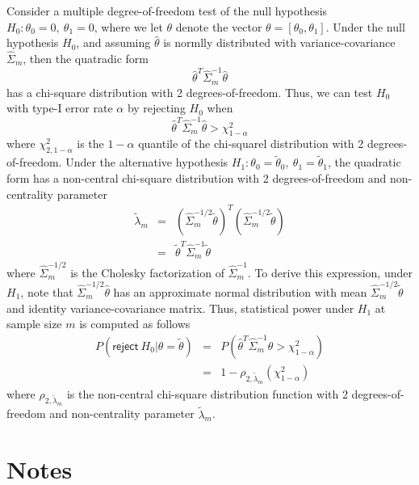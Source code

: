 \documentclass{article}
\begin{document}
Consider a multiple degree-of-freedom test of the null hypothesis $H_0: \theta_0 = 0,\ \theta_1 = 0$, where we let $\theta$ denote the vector $\theta = [\theta_0, \theta_1]$. Under the null hypothesis $H_0$, and assuming $\hat{\theta}$ is normlly distributed with variance-covariance $\hat{\Sigma}_m$,  then the quatradic form
$$
\hat{\theta}^T\hat{\Sigma}_m^{-1}\hat{\theta}
$$
 has a chi-square distribution with 2 degrees-of-freedom. Thus, we can test $H_0$ with type-I error rate $\alpha$ by rejecting $H_0$ when 
$$
\hat{\theta}^T\hat{\Sigma}_m^{-1}\hat{\theta} > \chi^2_{1-\alpha}
$$
where $\chi^2_{2,1-\alpha}$ is the $1-\alpha$ quantile of the chi-squarel distribution with 2 degrees-of-freedom. Under the alternative hypothesis $H_1: \theta_0 = \tilde{\theta}_0,\ \theta_1 = \tilde{\theta}_1$, the quadratic form has a non-central chi-square distribution with 2 degrees-of-freedom and non-centrality parameter
\begin{eqnarray}
\tilde{\lambda}_m &=& (\hat{\Sigma}_m^{-1/2}\tilde{\theta})^T(\hat{\Sigma}_m^{-1/2}\tilde{\theta}) \nonumber \\
&=& \tilde{\theta}^T\hat{\Sigma}_m^{-1} \tilde{\theta} \nonumber
\end{eqnarray}
where $\hat{\Sigma}_m^{-1/2}$ is the Cholesky factorization of $\hat{\Sigma}_m^{-1}$. To derive this expression, under $H_1$, note that $\hat{\Sigma}_m^{-1/2}\hat{\theta}$ has an approximate normal distribution with mean $\hat{\Sigma}_m^{-1/2}\tilde{\theta}$ and identity variance-covariance matrix. Thus, statistical power under $H_1$ at sample size $m$ is computed as follows
\begin{eqnarray}
P(\mathsf{reject}\ H_0 | \theta = \tilde{\theta}) &=& P\left(\hat{\theta}^T\hat{\Sigma}_m^{-1}\hat{\theta} > \chi^2_{1-\alpha}\right) \nonumber \\
&=& 1-\rho_{2,\tilde{\lambda}_m}\left(\chi^2_{1-\alpha}\right) \nonumber
\end{eqnarray}
where $\rho_{2,\tilde{\lambda}_m}$ is the non-central chi-square distribution function with 2 degrees-of-freedom and non-centrality parameter $\tilde{\lambda}_m$.


\section{Notes}
\end{document}
